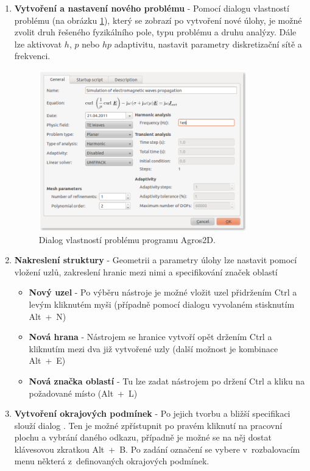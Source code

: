 \begin{enumerate}
\item {\bf Vytvoření a nastavení nového problému} - Pomocí dialogu vlastností problému (na obrázku \ref{obr:sim_problem_properties}), který se zobrazí po vytvoření nové úlohy, je možné zvolit druh řešeného fyzikálního pole, typu problému a druhu analýzy. Dále lze aktivovat $h$, $p$ nebo $hp$ adaptivitu, nastavit parametry diskretizační sítě a frekvenci.
\begin{figure}[!h]
	\centering
	\includegraphics[width=9cm]{sim_problem_properties.png}
	\caption{Dialog vlastností problému programu Agros2D.}
	\label{obr:sim_problem_properties}
\end{figure}
\item {\bf Nakreslení struktury} - Geometrii a parametry úlohy lze nastavit pomocí vložení uzlů, zakreslení hranic mezi nimi a specifikování značek oblastí
\begin{itemize}
\item {\bf Nový uzel} - Po výběru nástroje  je možné vložit uzel přidržením Ctrl a levým kliknutém myši (případně pomocí dialogu vyvolaném stisknutím \mbox{Alt + N})
\item {\bf Nová hrana} - Nástrojem  se hranice vytvoří opět držením Ctrl a kliknutím mezi dva již vytvořené uzly (další možnost je kombinace \mbox{Alt + E})
\item {\bf Nová značka oblastí} - Tu lze zadat nástrojem  po držení Ctrl a kliku na požadované místo (\mbox{Alt + L})
\end{itemize}
\item {\bf Vytvoření okrajových podmínek} - Po jejich tvorbu a bližší specifikaci slouží dialog . Ten je možné zpřístupnit po pravém kliknutí na pracovní plochu a vybrání daného odkazu, případně je možné se na něj dostat klávesovou zkratkou \mbox{Alt + B}. Po zadání označení se vybere v~rozbalovacím menu některá z~definovaných okrajových podmínek.


\end{enumerate}

